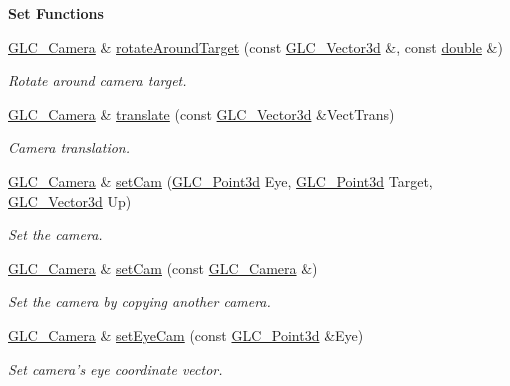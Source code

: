 \begin{Indent}{\bf Set Functions}
\begin{DoxyCompactItemize}
\hyperlink{class_g_l_c___camera}{G\-L\-C\-\_\-\-Camera} \& \hyperlink{class_g_l_c___camera_ae54d2166b2f3f93b7602c02c35b4e330}{rotate\-Around\-Target} (const \hyperlink{class_g_l_c___vector3d}{G\-L\-C\-\_\-\-Vector3d} \&, const \hyperlink{_super_l_u_support_8h_a8956b2b9f49bf918deed98379d159ca7}{double} \&)
\begin{DoxyCompactList}\small\item\em Rotate around camera target. \end{DoxyCompactList}\item 
\hyperlink{class_g_l_c___camera}{G\-L\-C\-\_\-\-Camera} \& \hyperlink{class_g_l_c___camera_a60a03405d0161a2aa215f9d4ec16c494}{translate} (const \hyperlink{class_g_l_c___vector3d}{G\-L\-C\-\_\-\-Vector3d} \&Vect\-Trans)
\begin{DoxyCompactList}\small\item\em Camera translation. \end{DoxyCompactList}\item 
\hyperlink{class_g_l_c___camera}{G\-L\-C\-\_\-\-Camera} \& \hyperlink{class_g_l_c___camera_a1c236df9bad696f60176323387096a34}{set\-Cam} (\hyperlink{glc__vector3d_8h_a4e13a9bbc7ab3d34de7e98b41836772c}{G\-L\-C\-\_\-\-Point3d} Eye, \hyperlink{glc__vector3d_8h_a4e13a9bbc7ab3d34de7e98b41836772c}{G\-L\-C\-\_\-\-Point3d} Target, \hyperlink{class_g_l_c___vector3d}{G\-L\-C\-\_\-\-Vector3d} Up)
\begin{DoxyCompactList}\small\item\em Set the camera. \end{DoxyCompactList}\item 
\hyperlink{class_g_l_c___camera}{G\-L\-C\-\_\-\-Camera} \& \hyperlink{class_g_l_c___camera_a342137b6daecbfb8ead3c13e60f6b77e}{set\-Cam} (const \hyperlink{class_g_l_c___camera}{G\-L\-C\-\_\-\-Camera} \&)
\begin{DoxyCompactList}\small\item\em Set the camera by copying another camera. \end{DoxyCompactList}\item 
\hyperlink{class_g_l_c___camera}{G\-L\-C\-\_\-\-Camera} \& \hyperlink{class_g_l_c___camera_afd162e5bf922f3e05b292aa8870e3b02}{set\-Eye\-Cam} (const \hyperlink{glc__vector3d_8h_a4e13a9bbc7ab3d34de7e98b41836772c}{G\-L\-C\-\_\-\-Point3d} \&Eye)
\begin{DoxyCompactList}\small\item\em Set camera's eye coordinate vector. \end{DoxyCompactList}\item 

\end{DoxyCompactItemize}
\end{Indent}
